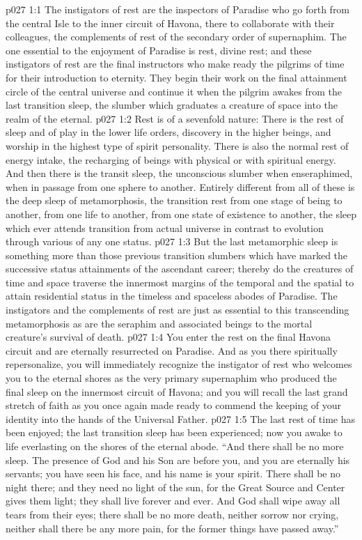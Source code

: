 \vs p027 1:1 The instigators of rest are the inspectors of Paradise who go forth from the central Isle to the inner circuit of Havona, there to collaborate with their colleagues, the complements of rest of the secondary order of supernaphim. The one essential to the enjoyment of Paradise is rest, divine rest; and these instigators of rest are the final instructors who make ready the pilgrims of time for their introduction to eternity. They begin their work on the final attainment circle of the central universe and continue it when the pilgrim awakes from the last transition sleep, the slumber which graduates a creature of space into the realm of the eternal.\plusone
\pc \vs p027 1:2 Rest is of a sevenfold nature: There is the rest of sleep and of play in the lower life orders, discovery in the higher beings, and worship in the highest type of spirit personality. There is also the normal rest of energy intake, the recharging of beings with physical or with spiritual energy. And then there is the transit sleep, the unconscious slumber when enseraphimed, when in passage from one sphere to another. Entirely different from all of these is the deep sleep of metamorphosis, the transition rest from one stage of being to another, from one life to another, from one state of existence to another, the sleep which ever attends transition from actual universe  in contrast to evolution through various  of any one status.
\vs p027 1:3 But the last metamorphic sleep is something more than those previous transition slumbers which have marked the successive status attainments of the ascendant career; thereby do the creatures of time and space traverse the innermost margins of the temporal and the spatial to attain residential status in the timeless and spaceless abodes of Paradise. The instigators and the complements of rest are just as essential to this transcending metamorphosis as are the seraphim and associated beings to the mortal creature’s survival of death.
\pc \vs p027 1:4 You enter the rest on the final Havona circuit and are eternally resurrected on Paradise. And as you there spiritually repersonalize, you will immediately recognize the instigator of rest who welcomes you to the eternal shores as the very primary supernaphim who produced the final sleep on the innermost circuit of Havona; and you will recall the last grand stretch of faith as you once again made ready to commend the keeping of your identity into the hands of the Universal Father.
\vs p027 1:5 The last rest of time has been enjoyed; the last transition sleep has been experienced; now you awake to life everlasting on the shores of the eternal abode. “And there shall be no more sleep. The presence of God and his Son are before you, and you are eternally his servants; you have seen his face, and his name is your spirit. There shall be no night there; and they need no light of the sun, for the Great Source and Center gives them light; they shall live forever and ever. And God shall wipe away all tears from their eyes; there shall be no more death, neither sorrow nor crying, neither shall there be any more pain, for the former things have passed away.”
